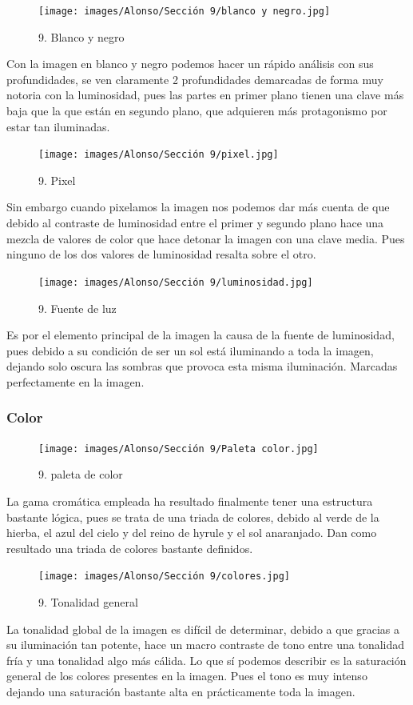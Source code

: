 \documentclass[12pt]{article}
\begin{document}
    \begin{figure}[H]
      \centering
      \texttt{[image: images/Alonso/Sección 9/blanco y negro.jpg]}
      \caption{\small 9. Blanco y negro}
    \end{figure}
    Con la imagen en blanco y negro podemos hacer un rápido análisis con sus profundidades, se ven claramente 2 profundidades demarcadas de forma muy notoria con la luminosidad, pues las partes en primer plano tienen una clave más baja que la que están en segundo plano, que adquieren más protagonismo por estar tan iluminadas.

    \begin{figure}[H]
      \centering
      \texttt{[image: images/Alonso/Sección 9/pixel.jpg]}
      \caption{\small 9. Pixel}
    \end{figure}

    Sin embargo cuando pixelamos la imagen nos podemos dar más cuenta de que debido al contraste de luminosidad entre el primer y segundo plano hace una mezcla de valores de color que hace detonar la imagen con una clave media. Pues ninguno de los dos valores de luminosidad resalta sobre el otro.

    \begin{figure}[H]
      \centering
      \texttt{[image: images/Alonso/Sección 9/luminosidad.jpg]}
      \caption{\small 9. Fuente de luz}
    \end{figure}

    Es por el elemento principal de la imagen la causa de la fuente de luminosidad, pues debido a su condición de ser un sol está iluminando a toda la imagen, dejando solo oscura las sombras que provoca esta misma iluminación. Marcadas perfectamente en la imagen.

        \subsubsection{Color}
        \begin{figure}[H]
      \centering
      \texttt{[image: images/Alonso/Sección 9/Paleta color.jpg]}
      \caption{\small 9. paleta de color}
    \end{figure}

        La gama cromática empleada ha resultado finalmente tener una estructura bastante lógica, pues se trata de una triada de colores, debido al verde de la hierba, el azul del cielo y del reino de hyrule y el sol anaranjado. Dan como resultado una triada de colores bastante definidos.
\begin{figure}[H]
      \centering
      \texttt{[image: images/Alonso/Sección 9/colores.jpg]}
      \caption{\small 9. Tonalidad general}
    \end{figure}
    La tonalidad global de la imagen es difícil de determinar, debido a que gracias a su iluminación tan potente, hace un macro contraste de tono entre una tonalidad fría y una tonalidad algo más cálida. Lo que sí podemos describir es la saturación general de los colores presentes en la imagen. Pues el tono es muy intenso dejando una saturación  bastante alta en prácticamente toda la imagen.
\end{document}
